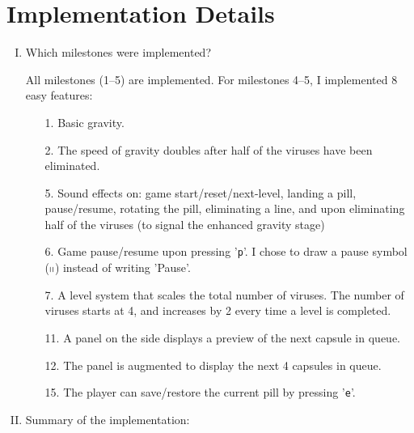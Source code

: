 \documentclass{article}
\begin{document}
\section{Implementation Details}

\begin{enumerate}[(I)]

\item Which milestones were implemented? 

All milestones (1--5) are implemented. For milestones 4--5, I implemented 8 easy features:
\begin{itemize}
\item[1.] Basic gravity.
\item[2.] The speed of gravity doubles after half of the viruses have been eliminated.
\item[5.] Sound effects on: game start/reset/next-level, landing a pill, pause/resume, rotating the pill, eliminating a line, and upon eliminating half of the viruses (to signal the enhanced gravity stage)
\item[6.] Game pause/resume upon pressing '\texttt{p}'. I chose to draw a pause symbol ($\shortparallel$) instead of writing 'Pause'.
\item[7.] A level system that scales the total number of viruses. The number of viruses starts at 4, and increases by 2 every time a level is completed.
\item[11.] A panel on the side displays a preview of the next capsule in queue.
\item[12.] The panel is augmented to display the next 4 capsules in queue.
\item[15.] The player can save/restore the current pill by pressing '\texttt{e}'.
\end{itemize}

\item Summary of the implementation:


\end{enumerate}
\end{document}
